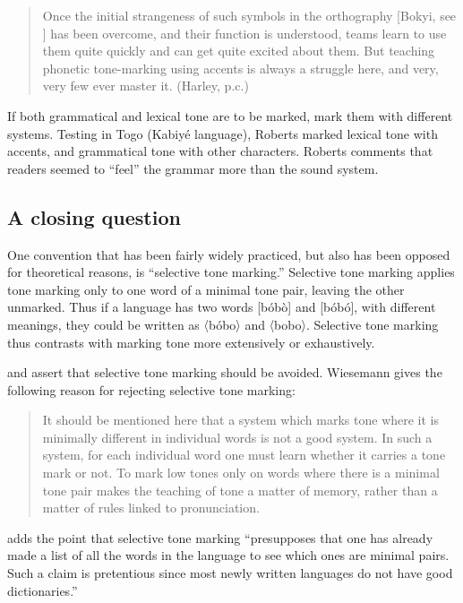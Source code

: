 \documentclass[output=paper]{langscibook}
\begin{document}
\begin{quote}
Once the initial strangeness of such symbols in the orthography [Bokyi, see ] has been overcome, and their function is understood, teams learn to use them quite quickly and can get quite excited about them. But teaching phonetic tone-marking using accents is always a struggle here, and very, very few ever master it. (Harley, p.c.)
\end{quote}

If both grammatical and lexical tone are to be marked, mark them with different systems. Testing in Togo (Kabiyé language), Roberts marked lexical tone with accents, and grammatical tone with other characters. Roberts comments that readers seemed to “feel” the grammar more than the sound system. 

\subsection{A closing question}
\label{sec:Conclusion:ClosingQuestion:2}
One convention that has been fairly widely practiced, but also has been opposed for theoretical reasons, is “selective tone marking.” Selective tone marking applies tone marking only to one word of a minimal tone pair, leaving the other unmarked. Thus if a language has two words [bóbò] and [bóbó], with different meanings, they could be written as 〈bóbo〉 and 〈bobo〉. Selective tone marking thus contrasts with marking tone more extensively or exhaustively.

\citet[16]{Wiesemann1989} and \citet[132--133]{Longacre1953} assert that selective tone marking should be avoided. Wiesemann gives the following reason for rejecting selective tone marking:

\begin{quote}
It should be mentioned here that a system which marks tone where it is minimally different in individual words is not a good system. In such a system, for each individual word one must learn whether it carries a tone mark or not. To mark low tones only on words where there is a minimal tone pair makes the teaching of tone a matter of memory, rather than a matter of rules linked to pronunciation.
\end{quote}

\citet[133]{Longacre1953} adds the point that selective tone marking “presupposes that one has already made a list of all the words in the language to see which ones are minimal pairs. Such a claim is pretentious since most newly written languages do not have good dictionaries.” 
\end{document}
